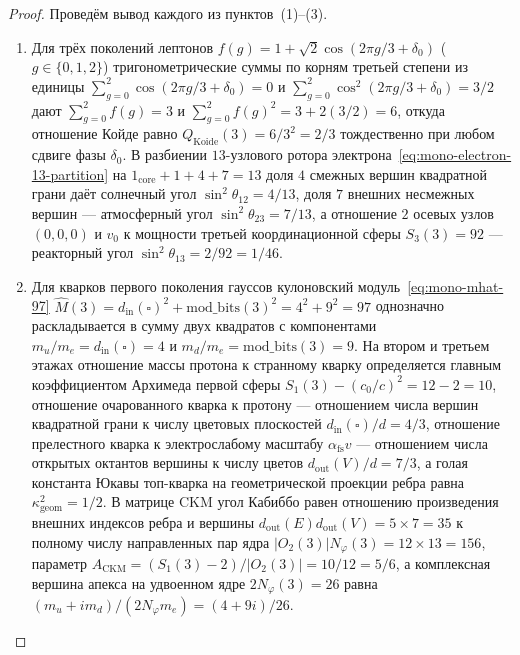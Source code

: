 \begin{proof}
Проведём вывод каждого из пунктов~(1)--(3).
\begin{enumerate}[label=\textbf{\arabic*.},leftmargin=*]
\item Для трёх поколений лептонов $f(g) = 1 + \sqrt{2}\cos(2\pi g/3 + \delta_0)$ ($g \in \{0, 1, 2\}$) тригонометрические суммы по корням третьей степени из единицы $\sum_{g=0}^2 \cos(2\pi g/3 + \delta_0) = 0$ и $\sum_{g=0}^2 \cos^2(2\pi g/3 + \delta_0) = 3/2$ дают $\sum_{g=0}^2 f(g) = 3$ и $\sum_{g=0}^2 f(g)^2 = 3 + 2(3/2) = 6$, откуда отношение Койде равно $Q_{\mathrm{Koide}}(3) = 6 / 3^2 = 2/3$ тождественно при любом сдвиге фазы $\delta_0$. В разбиении $13$-узлового ротора электрона~\eqref{eq:mono-electron-13-partition} на $1_{\mathrm{core}} + 1 + 4 + 7 = 13$ доля $4$ смежных вершин квадратной грани даёт солнечный угол $\sin^2\theta_{12} = 4/13$, доля $7$ внешних несмежных вершин --- атмосферный угол $\sin^2\theta_{23} = 7/13$, а отношение $2$ осевых узлов $(0,0,0)$ и $v_0$ к мощности третьей координационной сферы $S_3(3) = 92$ --- реакторный угол $\sin^2\theta_{13} = 2/92 = 1/46$.
\item Для кварков первого поколения гауссов кулоновский модуль~\eqref{eq:mono-mhat-97} $\widehat{M}(3) = d_{\mathrm{in}}(\square)^2 + \mathrm{mod\_bits}(3)^2 = 4^2 + 9^2 = 97$ однозначно раскладывается в сумму двух квадратов с компонентами $m_u/m_e = d_{\mathrm{in}}(\square) = 4$ и $m_d/m_e = \mathrm{mod\_bits}(3) = 9$. На втором и третьем этажах отношение массы протона к странному кварку определяется главным коэффициентом Архимеда первой сферы $S_1(3) - (c_0/c)^2 = 12 - 2 = 10$, отношение очарованного кварка к протону --- отношением числа вершин квадратной грани к числу цветовых плоскостей $d_{\mathrm{in}}(\square)/d = 4/3$, отношение прелестного кварка к электрослабому масштабу $\alpha_{\mathrm{fs}}v$ --- отношением числа открытых октантов вершины к числу цветов $d_{\mathrm{out}}(V)/d = 7/3$, а голая константа Юкавы топ-кварка на геометрической проекции ребра равна $\kappa_{\mathrm{geom}}^2 = 1/2$. В матрице CKM угол Кабиббо равен отношению произведения внешних индексов ребра и вершины $d_{\mathrm{out}}(E)d_{\mathrm{out}}(V) = 5\times 7 = 35$ к полному числу направленных пар ядра $|O_2(3)|N_\varphi(3) = 12\times 13 = 156$, параметр $A_{\mathrm{CKM}} = (S_1(3)-2)/|O_2(3)| = 10/12 = 5/6$, а комплексная вершина апекса на удвоенном ядре $2 N_\varphi(3) = 26$ равна $(m_u + i m_d)/(2 N_\varphi m_e) = (4 + 9i)/26$.

\end{enumerate}
\end{proof}
